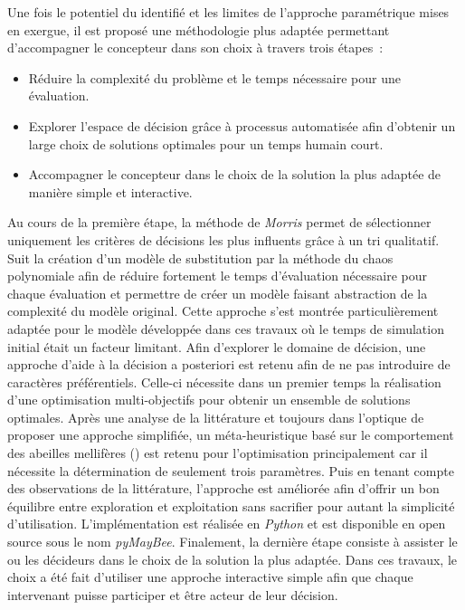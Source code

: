 Une fois le potentiel du  identifié et les limites de l’approche paramétrique
mises en exergue, il est proposé une méthodologie plus adaptée permettant d’accompagner
le concepteur dans son choix à travers trois étapes~:
\begin{itemize}
    \item Réduire la complexité du problème et le temps nécessaire pour une évaluation.
    \item Explorer l’espace de décision grâce à processus automatisée afin d’obtenir
          un large choix de solutions optimales pour un temps humain court.
    \item Accompagner le concepteur dans le choix de la solution la plus adaptée
          de manière simple et interactive.
\end{itemize}
Au cours de la première étape, la méthode de \textit{Morris} permet de sélectionner uniquement
les critères de décisions les plus influents grâce à un tri qualitatif. Suit la création
d’un modèle de substitution par la méthode du chaos polynomiale afin de réduire fortement le temps d’évaluation nécessaire
pour chaque évaluation et permettre de créer un modèle faisant abstraction de la complexité du modèle original.
Cette approche s’est montrée particulièrement adaptée pour le
modèle développée dans ces travaux où le temps de simulation initial était un facteur
limitant. Afin d’explorer le domaine de décision, une approche d’aide à la décision a
posteriori est retenu afin de ne pas introduire de caractères préférentiels. Celle-ci
nécessite dans un premier temps la réalisation d’une optimisation multi-objectifs pour
obtenir un ensemble de solutions optimales. Après une analyse de la littérature et
toujours dans l’optique de proposer une approche simplifiée, un méta-heuristique basé sur
le comportement des abeilles mellifères () est retenu pour l’optimisation principalement car
il nécessite la détermination de seulement trois paramètres. Puis en tenant compte des observations
de la littérature, l’approche est améliorée afin d’offrir un bon équilibre entre exploration
et exploitation sans sacrifier pour autant la simplicité d’utilisation. L’implémentation est
réalisée en \textit{Python} et est disponible en open source sous le nom \textit{pyMayBee}.
Finalement, la dernière étape consiste à assister le ou
les décideurs dans le choix de la solution la plus adaptée. Dans ces travaux, le choix a
été fait d’utiliser une approche interactive simple afin que chaque intervenant puisse
participer et être acteur de leur décision.


